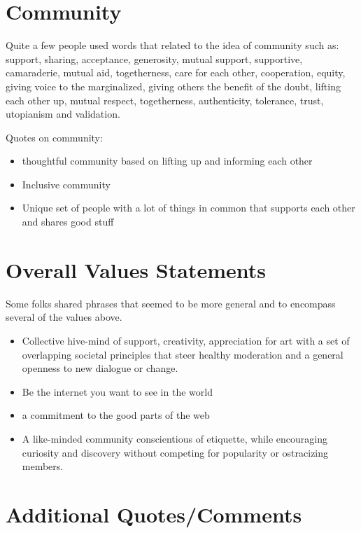 \documentclass[
]{book}
\providecommand{\tightlist}{%
  \setlength{\itemsep}{0pt}\setlength{\parskip}{0pt}}
\begin{document}
\section{Community}\label{community}

Quite a few people used words that related to the idea of community such as: support, sharing, acceptance, generosity, mutual support, supportive, camaraderie, mutual aid, togetherness, care for each other, cooperation, equity, giving voice to the marginalized, giving others the benefit of the doubt, lifting each other up, mutual respect, togetherness, authenticity, tolerance, trust, utopianism and validation.

Quotes on community:

\begin{itemize}
\tightlist
\item
  thoughtful community based on lifting up and informing each other
\item
  Inclusive community
\item
  Unique set of people with a lot of things in common that supports each other and shares good stuff
\end{itemize}

\section{Overall Values Statements}\label{overall-values-statements}

Some folks shared phrases that seemed to be more general and to encompass several of the values above.

\begin{itemize}
\tightlist
\item
  Collective hive-mind of support, creativity, appreciation for art with a set of overlapping societal principles that steer healthy moderation and a general openness to new dialogue or change.
\item
  Be the internet you want to see in the world
\item
  a commitment to the good parts of the web
\item
  A like-minded community conscientious of etiquette, while encouraging curiosity and discovery without competing for popularity or ostracizing members.
\end{itemize}

\section{Additional Quotes/Comments}\label{additional-quotescomments}
\end{document}
